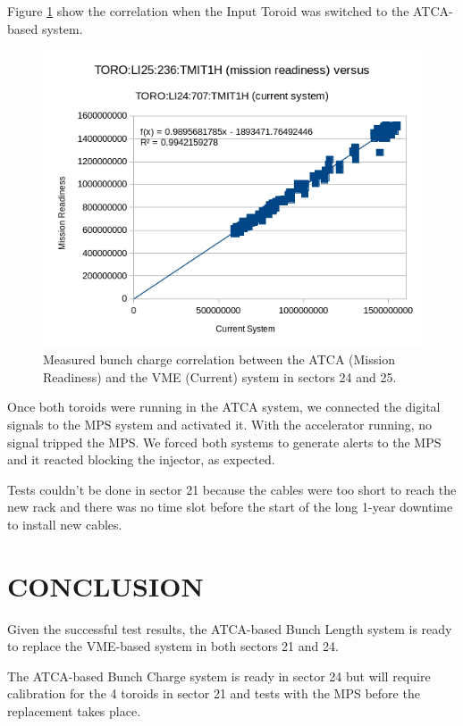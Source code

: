 \documentclass[letter,
        biblatex,   %
        keeplastbox,  %
        ]{jacow}
\begin{document}
Figure \ref{fig:bcm_result} show the correlation when the Input Toroid was switched to the ATCA-based system.

\begin{figure}[!htb]
  \centering
  \includegraphics*[width=\columnwidth]{bcm_result}
  \caption{Measured bunch charge correlation between the ATCA (Mission Readiness) and the VME (Current) system in sectors 24 and 25.}
  \label{fig:bcm_result}
\end{figure}

Once both toroids were running in the ATCA system, we connected the digital signals to the MPS system and activated it. With the accelerator running, no signal tripped the MPS. We forced both systems to generate alerts to the MPS and it reacted blocking the injector, as expected.

Tests couldn't be done in sector 21 because the cables were too short to reach the new rack and there was no time slot before the start of the long 1-year downtime to install new cables.

\section{CONCLUSION}
Given the successful test results, the ATCA-based Bunch Length system is ready to replace the VME-based system in both sectors 21 and 24.

The ATCA-based Bunch Charge system is ready in sector 24 but will require calibration for the 4 toroids in sector 21 and tests with the MPS before the replacement takes place.
\end{document}
